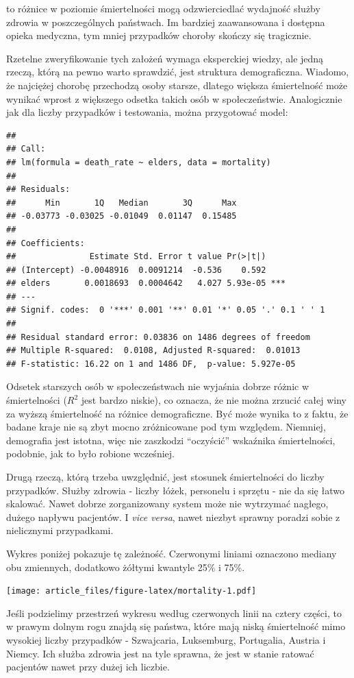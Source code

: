 \documentclass[
]{article}
\begin{document}
to różnice w poziomie śmiertelności mogą odzwierciedlać wydajność służby
zdrowia w poszczególnych państwach. Im bardziej zaawansowana i dostępna
opieka medyczna, tym mniej przypadków choroby skończy się tragicznie.

Rzetelne zweryfikowanie tych założeń wymaga eksperckiej wiedzy, ale
jedną rzeczą, którą na pewno warto sprawdzić, jest struktura
demograficzna. Wiadomo, że najciężej chorobę przechodzą osoby starsze,
dlatego większa śmiertelność może wynikać wprost z większego odsetka
takich osób w społeczeństwie. Analogicznie jak dla liczby przypadków i
testowania, można przygotować model:

\begin{verbatim}
## 
## Call:
## lm(formula = death_rate ~ elders, data = mortality)
## 
## Residuals:
##      Min       1Q   Median       3Q      Max 
## -0.03773 -0.03025 -0.01049  0.01147  0.15485 
## 
## Coefficients:
##               Estimate Std. Error t value Pr(>|t|)    
## (Intercept) -0.0048916  0.0091214  -0.536    0.592    
## elders       0.0018693  0.0004642   4.027 5.93e-05 ***
## ---
## Signif. codes:  0 '***' 0.001 '**' 0.01 '*' 0.05 '.' 0.1 ' ' 1
## 
## Residual standard error: 0.03836 on 1486 degrees of freedom
## Multiple R-squared:  0.0108, Adjusted R-squared:  0.01013 
## F-statistic: 16.22 on 1 and 1486 DF,  p-value: 5.927e-05
\end{verbatim}

Odsetek starszych osób w społeczeństwach nie wyjaśnia dobrze różnic w
śmiertelności (\(R^2\) jest bardzo niskie), co oznacza, że nie można
zrzucić całej winy za wyższą śmiertelność na różnice demograficzne. Być
może wynika to z faktu, że badane kraje nie są zbyt mocno zróżnicowane
pod tym względem. Niemniej, demografia jest istotna, więc nie zaszkodzi
``oczyścić'' wskaźnika śmiertelności, podobnie, jak to było robione
wcześniej.

Drugą rzeczą, którą trzeba uwzględnić, jest stosunek śmiertelności do
liczby przypadków. Służby zdrowia - liczby łóżek, personelu i sprzętu -
nie da się łatwo skalować. Nawet dobrze zorganizowany system może nie
wytrzymać nagłego, dużego napływu pacjentów. I \emph{vice versa}, nawet
niezbyt sprawny poradzi sobie z nielicznymi przypadkami.

Wykres poniżej pokazuje tę zależność. Czerwonymi liniami oznaczono
mediany obu zmiennych, dodatkowo żółtymi kwantyle 25\% i 75\%.

\texttt{[image: article\_files/figure-latex/mortality-1.pdf]}

Jeśli podzielimy przestrzeń wykresu według czerwonych linii na cztery
części, to w prawym dolnym rogu znajdą się państwa, które mają niską
śmiertelność mimo wysokiej liczby przypadków - Szwajcaria, Luksemburg,
Portugalia, Austria i Niemcy. Ich służba zdrowia jest na tyle sprawna,
że jest w stanie ratować pacjentów nawet przy dużej ich liczbie.
\end{document}
